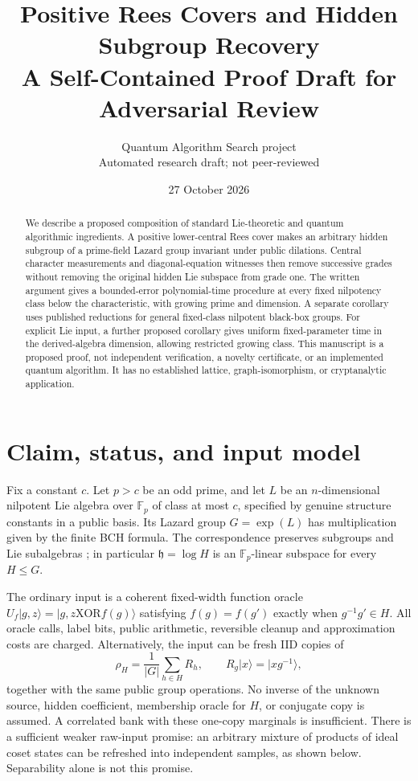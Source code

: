 \documentclass[11pt]{article}
\title{Positive Rees Covers and Hidden Subgroup Recovery\\
\large A Self-Contained Proof Draft for Adversarial Review}
\author{Quantum Algorithm Search project\\Automated research draft; not peer-reviewed}
\date{27 October 2026}
\theoremstyle{remark}
\newcommand{\Fp}{\mathbb F_p}
\begin{document}
\maketitle
\begin{abstract}
We describe a proposed composition of standard Lie-theoretic and quantum
algorithmic ingredients. A positive lower-central Rees cover makes an
arbitrary hidden subgroup of a prime-field Lazard group invariant under
public dilations. Central character measurements and diagonal-equation
witnesses then remove successive grades without removing the original
hidden Lie subspace from grade one. The written argument gives a
bounded-error polynomial-time procedure at every fixed nilpotency class
below the characteristic, with growing prime and dimension. A separate
corollary uses published reductions for general fixed-class nilpotent
black-box groups. For explicit Lie input, a further proposed corollary gives
uniform fixed-parameter time in the derived-algebra dimension, allowing
restricted growing class. This manuscript is a proposed proof, not independent
verification, a novelty certificate, or an implemented quantum algorithm.
It has no established lattice, graph-isomorphism, or cryptanalytic application.
\end{abstract}

\section{Claim, status, and input model}
Fix a constant $c$. Let $p>c$ be an odd prime, and let $L$ be an
$n$-dimensional nilpotent Lie algebra over $\Fp$ of class at most $c$,
specified by genuine structure constants in a public basis. Its Lazard
group $G=\exp(L)$ has multiplication given by the finite BCH formula.
The correspondence preserves subgroups and Lie subalgebras
\cite[Section 2.3]{lazard}; in particular $\mathfrak h=\log H$ is an
$\Fp$-linear subspace for every $H\le G$.

The ordinary input is a coherent fixed-width function oracle
$U_f|g,z\rangle=|g,z\mathbin{\mathrm{XOR}} f(g)\rangle$ satisfying
$f(g)=f(g')$ exactly when $g^{-1}g'\in H$. All oracle calls, label bits,
public arithmetic, reversible cleanup and approximation costs are charged.
Alternatively, the input can be fresh IID copies of
\[
 \rho_H=\frac1{|G|}\sum_{h\in H}R_h,
 \qquad R_g|x\rangle=|xg^{-1}\rangle,
\]
together with the same public group operations. No inverse of the unknown
source, hidden coefficient, membership oracle for $H$, or conjugate copy
is assumed. A correlated bank with these one-copy marginals is insufficient.
There is a sufficient weaker raw-input promise: an arbitrary mixture of
products of ideal coset states can be refreshed into independent samples,
as shown below. Separability alone is not this promise.
\end{document}
